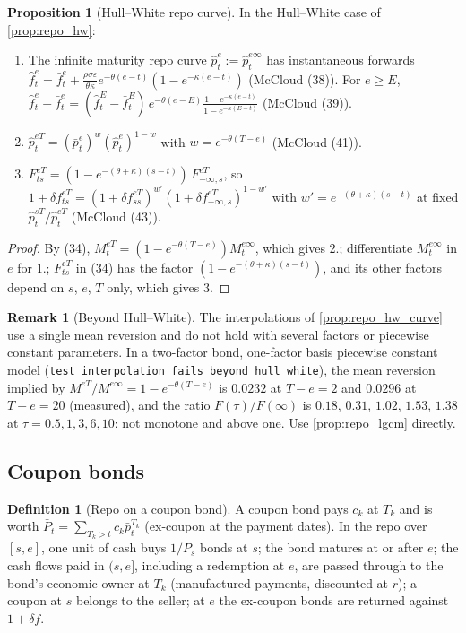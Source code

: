 \documentclass[11pt,english]{amsart}
\theoremstyle{definition}
\newtheorem{prop}{Proposition}
\newtheorem{defi}{Definition}
\newtheorem{rema}{Remark}
\begin{document}
\begin{prop}[Hull--White repo curve]\label{prop:repo_hw_curve}
In the Hull--White case of \autoref{prop:repo_hw}:
\begin{enumerate}
\item The infinite maturity repo curve $\hat p^{e}_t := \hat p^{e\infty}_t$ has instantaneous forwards $\hat f^e_t = \bar f^e_t + \frac{\rho\sigma\varepsilon}{\theta\kappa}e^{-\theta(e-t)}(1-e^{-\kappa(e-t)})$ (McCloud (38)). For $e\ge E$, $\hat f^e_t - \bar f^e_t = (\hat f^E_t - \bar f^E_t)\,e^{-\theta(e-E)}\frac{1-e^{-\kappa(e-t)}}{1-e^{-\kappa(E-t)}}$ (McCloud (39)).
\item $\hat p^{eT}_t = (\bar p^e_t)^{w}(\hat p^{e}_t)^{1-w}$ with $w = e^{-\theta(T-e)}$ (McCloud (41)).
\item $F^{eT}_{ts} = (1 - e^{-(\theta+\kappa)(s-t)})\,F^{eT}_{-\infty,s}$, so $1+\delta f^{eT}_{ts} = (1+\delta f^{eT}_{ss})^{w'}(1+\delta f^{eT}_{-\infty,s})^{1-w'}$ with $w' = e^{-(\theta+\kappa)(s-t)}$ at fixed $\hat p^{sT}_t/\hat p^{eT}_t$ (McCloud (43)).
\end{enumerate}
\end{prop}

\begin{proof}
By (34), $M^{eT}_t = (1-e^{-\theta(T-e)})M^{e\infty}_t$, which gives 2.; differentiate $M^{e\infty}_t$ in $e$ for 1.; $F^{eT}_{ts}$ in (34) has the factor $(1-e^{-(\theta+\kappa)(s-t)})$, and its other factors depend on $s$, $e$, $T$ only, which gives 3.
\end{proof}

\begin{rema}[Beyond Hull--White]
The interpolations of \autoref{prop:repo_hw_curve} use a single mean reversion and do not hold with several factors or piecewise constant parameters. In a two-factor bond, one-factor basis piecewise constant model (\texttt{test\_interpolation\_fails\_beyond\_hull\_white}), the mean reversion implied by $M^{eT}/M^{e\infty} = 1-e^{-\theta(T-e)}$ is $0.0232$ at $T-e = 2$ and $0.0296$ at $T-e = 20$ (measured), and the ratio $F(\tau)/F(\infty)$ is $0.18$, $0.31$, $1.02$, $1.53$, $1.38$ at $\tau = 0.5, 1, 3, 6, 10$: not monotone and above one. Use \autoref{prop:repo_lgcm} directly.
\end{rema}

\subsection{Coupon bonds}

\begin{defi}[Repo on a coupon bond]
A coupon bond pays $c_k$ at $T_k$ and is worth $\bar P_t = \sum_{T_k>t} c_k\bar p^{T_k}_t$ (ex-coupon at the payment dates). In the repo over $[s,e]$, one unit of cash buys $1/\bar P_s$ bonds at $s$; the bond matures at or after $e$; the cash flows paid in $(s,e]$, including a redemption at $e$, are passed through to the bond's economic owner at $T_k$ (manufactured payments, discounted at $r$); a coupon at $s$ belongs to the seller; at $e$ the ex-coupon bonds are returned against $1+\delta f$.
\end{defi}
\end{document}
